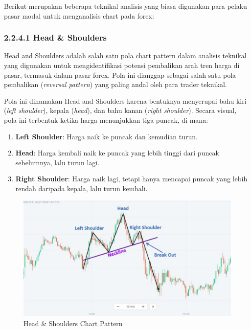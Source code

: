 Berikut merupakan beberapa teknikal analisis yang biasa digunakan para pelaku pasar modal untuk menganalisis chart pada forex:

\subsubsection*{2.2.4.1 Head \& Shoulders}
Head and Shoulders adalah salah satu pola chart pattern dalam analisis teknikal yang digunakan untuk mengidentifikasi potensi pembalikan arah tren harga di pasar, termasuk dalam pasar forex. Pola ini dianggap sebagai salah satu pola pembalikan (\textit{reversal pattern}) yang paling andal oleh para trader teknikal.

Pola ini dinamakan Head and Shoulders karena bentuknya menyerupai bahu kiri (\textit{left shoulder}), kepala (\textit{head}), dan bahu kanan (\textit{right shoulder}). Secara visual, pola ini terbentuk ketika harga menunjukkan tiga puncak, di mana:

\begin{enumerate}
    \item \textbf{Left Shoulder}: Harga naik ke puncak dan kemudian turun.
    \item \textbf{Head}: Harga kembali naik ke puncak yang lebih tinggi dari puncak sebelumnya, lalu turun lagi.
    \item \textbf{Right Shoulder}: Harga naik lagi, tetapi hanya mencapai puncak yang lebih rendah daripada kepala, lalu turun kembali.
\end{enumerate}

\begin{figure} [H] \centering
    \includegraphics[scale=0.35]{gambar/headshoulders.jpg} 
    \caption{Head \& Shoulders Chart Pattern}
    \label{fig:label_gambar}
\end{figure}

